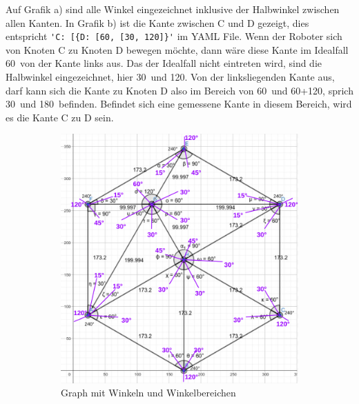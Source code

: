 Auf Grafik a) sind alle Winkel eingezeichnet inklusive der Halbwinkel zwischen allen Kanten. In Grafik b) ist die Kante zwischen C und D gezeigt, dies entspricht \verb|'C: [{D: [60, [30, 120]}'| im YAML File. 
Wenn der Roboter sich von Knoten C zu Knoten D bewegen möchte, dann wäre diese Kante im Idealfall 60\textdegree\ von der Kante links aus. Das der Idealfall nicht eintreten wird, sind die Halbwinkel eingezeichnet, hier 30\textdegree\ und 120\textdegree. Von der linksliegenden Kante aus, darf kann sich die Kante zu Knoten D also im Bereich von 60\textdegree\ und 60\textdegree+120\textdegree, sprich 30\textdegree\ und 180\textdegree\ befinden. Befindet sich eine gemessene Kante in diesem Bereich, wird es die Kante C zu D sein.

\begin{figure}[H]
\begin{subfigure}{0.65\textwidth}
\includegraphics[width=0.95\linewidth]{assets/informatik-prototyp/graph-angles.png} 
\caption{Graph mit Winkeln und Winkelbereichen}
\label{fig:angled-graph}
\end{subfigure}
\begin{subfigure}{0.32\textwidth}

\end{subfigure}
\end{figure}
